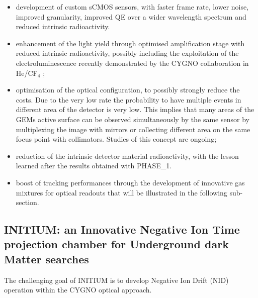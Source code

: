 \documentclass[physics,article,submit,moreauthors,pdftex]{Definitions/mdpi}
\begin{document}
\begin{itemize}
\item development of custom sCMOS sensors, with faster frame rate, lower noise, improved granularity, improved QE over a wider wavelength spectrum and reduced intrinsic radioactivity. 
\item enhancement of the light yield through optimised amplification stage with reduced intrinsic radioactivity, possibly including the exploitation of the electroluminescence recently demonstrated by the CYGNO collaboration in He/CF$_4$ \cite{Baracchini:2020dib}; 
\item optimisation of the optical configuration, to possibly strongly reduce the costs. Due to the very low rate the probability to have multiple events in different area of the detector is very low. This implies that many areas of the GEMs active surface can be observed simultaneously by the same sensor by multiplexing the image with  mirrors or collecting different area on the same focus point with collimators. Studies of this concept are ongoing;
\item reduction of the intrinsic detector material radioactivity, with the lesson learned after the results obtained with PHASE\_1.
\item boost of tracking performances through the development of innovative gas mixtures for optical readouts that will be illustrated in the following sub-section.
\end{itemize}



\subsection{INITIUM: an Innovative Negative Ion Time projection chamber for Underground dark Matter searches}

The challenging goal of INITIUM is to develop Negative Ion Drift (NID) operation within the CYGNO optical approach. 
\end{document}
